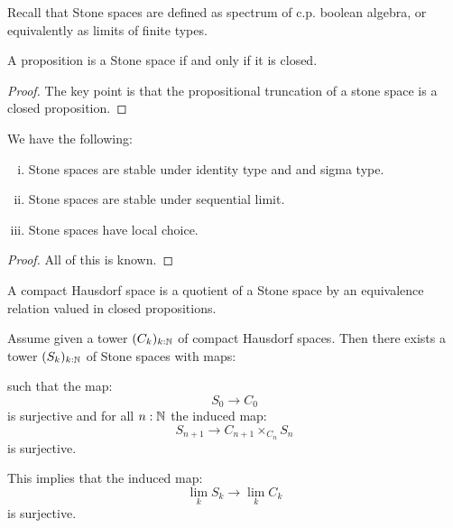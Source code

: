 Recall that Stone spaces are defined as spectrum of c.p. boolean algebra, or equivalently as limits of finite types.

\begin{lemma}
A proposition is a Stone space if and only if it is closed.
\end{lemma}

\begin{proof}
The key point is that the propositional truncation of a stone space is a closed proposition.
\end{proof}

\begin{theorem}
We have the following:
\begin{enumerate}[(i)]
\item Stone spaces are stable under identity type and and sigma type.
\item Stone spaces are stable under sequential limit.
\item Stone spaces have local choice.
\end{enumerate}
\end{theorem}

\begin{proof}
All of this is known.
\end{proof}

\begin{definition}
A compact Hausdorf space is a quotient of a Stone space by an equivalence relation valued in closed propositions.
\end{definition}

\begin{lemma}\label{sequential-limit-hausdorf}
Assume given a tower $(C_k)_{k:\mathbb{N}}$ of compact Hausdorf spaces. Then there exists a tower $(S_k)_{k:\mathbb{N}}$ of Stone spaces with maps:

\begin{center}
\end{center}

such that the map:
\[S_0\to C_0\]
is surjective and for all $n:\mathbb{N}$ the induced map:
\[S_{n+1} \to C_{n+1}\times_{C_n} S_n\]
is surjective.

This implies that the induced map:
\[\lim_kS_k \to \lim_k C_k\]
is surjective.
\end{lemma}

